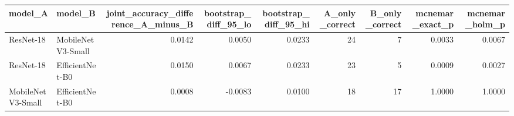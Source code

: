 \begin{tabular}{llrrrrrrr}
\toprule
model_A & model_B & joint_accuracy_difference_A_minus_B & bootstrap_diff_95_lo & bootstrap_diff_95_hi & A_only_correct & B_only_correct & mcnemar_exact_p & mcnemar_holm_p \\
\midrule
ResNet-18 & MobileNetV3-Small & 0.0142 & 0.0050 & 0.0233 & 24 & 7 & 0.0033 & 0.0067 \\
ResNet-18 & EfficientNet-B0 & 0.0150 & 0.0067 & 0.0233 & 23 & 5 & 0.0009 & 0.0027 \\
MobileNetV3-Small & EfficientNet-B0 & 0.0008 & -0.0083 & 0.0100 & 18 & 17 & 1.0000 & 1.0000 \\
\bottomrule
\end{tabular}
